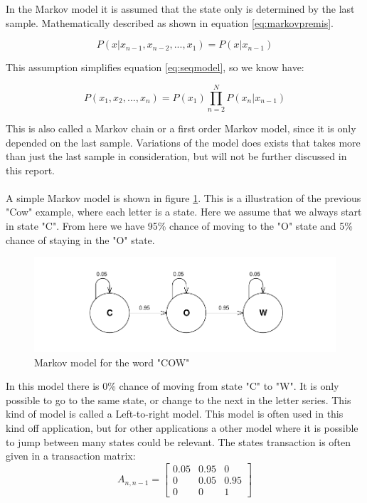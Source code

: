 In the Markov model it is assumed that the state only is determined by the last sample. Mathematically described as shown in equation \ref{eq:markovpremis}.

\begin{equation}
 P(x| x_{n-1}, x_{n-2}, ..., x_1) = P(x| x_{n-1}) 
 \label{eq:markovpremis}
\end{equation}

This assumption simplifies equation \ref{eq:seqmodel}, so we know have:

\begin{equation}
 P(x_1, x_2, ..., x_n) = P(x_1) \prod\limits_{n=2}^N{P(x_n| x_{n-1})}
\end{equation}

This is also called a Markov chain or a first order Markov model, since it is only depended on the last sample. Variations of the model does exists that takes more than just the last sample in consideration, but will not be further discussed in this report.  
\\\ \\
A simple Markov model is shown in figure \ref{fig:simpleMarkov}. This is a illustration of the previous "Cow" example, where each letter is a state. Here we assume that we always start in state "C". From here we have 95\% chance of moving to the "O" state and 5\% chance of staying in the "O" state. 

\begin{figure}[H]
\centering
\includegraphics[scale=0.8]{billeder/simpleMarkov}
\caption{Markov model for the word "COW"}
\label{fig:simpleMarkov}
\end{figure}
		
In this model there is 0\% chance of moving from state "C" to "W". It is only possible to go to the same state, or change to the next in the letter series. This kind of model is called a Left-to-right model. This model is often used in this kind off application, but for other applications a other model where it is possible to jump between many states could be relevant. The states transaction is often given in a transaction matrix: 
\begin{equation}
	A_{n,n-1} = 
	\begin{bmatrix}
  	0.05 & 0.95 & 0 \\
  	0 & 0.05 & 0.95	\\
  	0 & 0 & 	1
 	\end{bmatrix}
 	\label{eq:Amat}
\end{equation}

